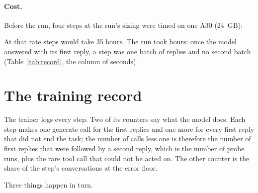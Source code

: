 \documentclass[11pt,a4paper]{article}
\begin{document}
\paragraph{Cost.} Before the run, four steps at the run's sizing were timed
on one A30 (24~GB):

\begin{table}[h]
\centering\small

\caption{The timing run. A step with all \TRconversations{} conversations at
two replies takes close to four minutes and fits the A30 with 6~GiB to
spare.}
\end{table}

At that rate \TRsteps{} steps would take 35 hours. The run took \TRhours{} hours:
once the model answered with its first reply, a step was one batch of
\TRgone{} replies and no second batch (Table~\ref{tab:record}, the column of
seconds).

\section{The training record}

The trainer logs every step. Two of its counters say what the model does.
Each step makes one generate call for the \TRgone{} first replies and one
more for every first reply that did not end the task; the number of calls
less one is therefore the number of first replies that were followed by a
second reply, which is the number of probe runs, plus the rare tool call
that could not be acted on. The other counter is the share of the step's
conversations at the error floor.

\begin{table}[h]
\centering\small
\resizebox{\linewidth}{!}{}
\caption{The training record, on the training tasks: the first five
iterations one by one, then three stretches. Every iteration is in
Table~\ref{tab:full} at the end.}
\label{tab:record}
\end{table}

Three things happen in turn.
\end{document}

